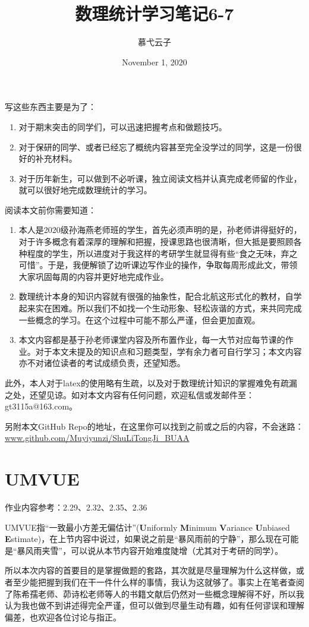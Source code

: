 \documentclass[10pt, a4paper]{article}
\title{数理统计学习笔记6-7}
\author{慕弋云子}
\date{November 1, 2020}
\begin{document}
\setcounter{section}{5}
\maketitle

写这些东西主要是为了：
\begin{enumerate}
    \item 对于期末突击的同学们，可以迅速把握考点和做题技巧。
    \item 对于保研的同学、或者已经忘了概统内容甚至完全没学过的同学，这是一份很好的补充材料。
    \item 对于历年新生，可以做到不必听课，独立阅读文档并认真完成老师留的作业，就可以很好地完成数理统计的学习。
\end{enumerate}

阅读本文前你需要知道：
\begin{enumerate}
    \item 本人是2020级孙海燕老师班的学生，首先必须声明的是，孙老师讲得挺好的，对于许多概念有着深厚的理解和把握，授课思路也很清晰，但大抵是要照顾各种程度的学生，所以进度对于我这样的考研学生就显得有些“食之无味，弃之可惜”。于是，我便解锁了边听课边写作业的操作，争取每周形成此文，带领大家巩固每周的内容并更好地完成作业。
    \item 数理统计本身的知识内容就有很强的抽象性，配合北航这形式化的教材，自学起来实在困难。所以我们不如找一个生动形象、轻松诙谐的方式，来共同完成一些概念的学习。在这个过程中可能不那么严谨，但会更加直观。
    \item 本文内容都是基于孙老师课堂内容及所布置作业，每一大节对应每节课的作业。对于本文未提及的知识点和习题类型，学有余力者可自行学习；本文内容亦不对诸位读者的考试成绩负责，还望知悉。
\end{enumerate}\par

此外，本人对于latex的使用略有生疏，以及对于数理统计知识的掌握难免有疏漏之处，还望见谅。如对本文内容有任何问题，欢迎私信或发邮件至：gt3115a@163.com。\par
另附本文GitHub Repo的地址，在这里你可以找到之前或之后的内容，不会迷路：\url{www.github.com/Muyiyunzi/ShuLiTongJi_BUAA}

\section{UMVUE}
作业内容参考：2.29、2.32、2.35、2.36\par
UMVUE指“一致最小方差无偏估计”(\textbf{U}niformly \textbf{M}inimum \textbf{V}ariance \textbf{U}nbiased \textbf{E}stimate)，在上节内容中说过，如果说之前是“暴风雨前的宁静”，那么现在可能是“暴风雨夹雪”，可以说从本节内容开始难度陡增（尤其对于考研的同学）。\par
所以本次内容的首要目的是掌握做题的套路，其次就是尽量理解为什么这样做，或者至少能把握到我们在干一件什么样的事情，我认为这就够了。事实上在笔者查阅了陈希孺老师、茆诗松老师等人的书籍文献后仍然对一些概念理解得不好，所以我认为我也做不到讲述得完全严谨，但可以做到尽量生动有趣，如有任何谬误和理解偏差，也欢迎各位讨论与指正。\par
\end{document}
